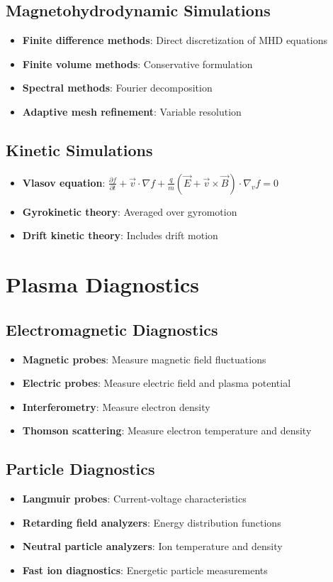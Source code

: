 \documentclass[11pt]{article}
\theoremstyle{definition}
\begin{document}
\subsection{Magnetohydrodynamic Simulations}
\begin{itemize}
    \item \textbf{Finite difference methods}: Direct discretization of MHD equations
    \item \textbf{Finite volume methods}: Conservative formulation
    \item \textbf{Spectral methods}: Fourier decomposition
    \item \textbf{Adaptive mesh refinement}: Variable resolution
\end{itemize}

\subsection{Kinetic Simulations}
\begin{itemize}
    \item \textbf{Vlasov equation}: $\frac{\partial f}{\partial t} + \vec{v} \cdot \nabla f + \frac{q}{m}(\vec{E} + \vec{v} \times \vec{B}) \cdot \nabla_v f = 0$
    \item \textbf{Gyrokinetic theory}: Averaged over gyromotion
    \item \textbf{Drift kinetic theory}: Includes drift motion
\end{itemize}

\section{Plasma Diagnostics}

\subsection{Electromagnetic Diagnostics}
\begin{itemize}
    \item \textbf{Magnetic probes}: Measure magnetic field fluctuations
    \item \textbf{Electric probes}: Measure electric field and plasma potential
    \item \textbf{Interferometry}: Measure electron density
    \item \textbf{Thomson scattering}: Measure electron temperature and density
\end{itemize}

\subsection{Particle Diagnostics}
\begin{itemize}
    \item \textbf{Langmuir probes}: Current-voltage characteristics
    \item \textbf{Retarding field analyzers}: Energy distribution functions
    \item \textbf{Neutral particle analyzers}: Ion temperature and density
    \item \textbf{Fast ion diagnostics}: Energetic particle measurements
\end{itemize}
\end{document}
